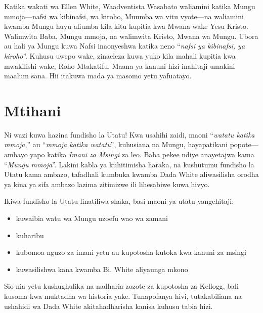 Katika wakati wa Ellen White, Waadventista Wasabato waliamini katika Mungu mmoja—nafsi wa kibinafsi, wa kiroho, Muumba wa vitu vyote—na waliamini kwamba Mungu huyu aliumba kila kitu kupitia kwa Mwana wake Yesu Kristo. Walimwita Baba, Mungu mmoja, na walimwita Kristo, Mwana wa Mungu. Ubora au hali ya Mungu kuwa Nafsi inaonyeshwa katika neno “\textit{nafsi ya kibinafsi, ya kiroho}”. Kuhusu uwepo wake,  zinaeleza kuwa yuko kila mahali kupitia kwa mwakilishi wake, Roho Mtakatifu. Maana ya kanuni hizi inahitaji umakini maalum sana. Hii itakuwa mada ya masomo yetu yafuatayo.

\section*{Mtihani}

Ni wazi kuwa  hazina fundisho la Utatu! Kwa usahihi zaidi, maoni “\textit{watatu katika mmoja},” au “\textit{mmoja katika watatu}”, kuhusiana na Mungu, hayapatikani popote—ambayo yapo katika \textit{Imani za Msingi} za leo. Baba pekee ndiye anayetajwa kama “\textit{Mungu mmoja}”. Lakini kabla ya kuhitimisha haraka, na kushutumu fundisho la Utatu kama ambazo, tafadhali kumbuka kwamba Dada White aliwasilisha orodha ya kina ya sifa ambazo lazima zitimizwe ili lihesabiwe kuwa hivyo.

Ikiwa fundisho la Utatu linatiliwa shaka, basi maoni ya utatu yangehitaji:
\begin{itemize}
    \item kuwaibia watu wa Mungu uzoefu wao wa zamani
    \item kuharibu 
    \item kubomoa nguzo za imani yetu au kupotosha kutoka kwa kanuni za msingi
    \item kuwasilishwa kana kwamba Bi. White aliyaunga mkono
\end{itemize}

Sio nia yetu kushughulika na nadharia zozote za kupotosha za Kellogg, bali kusoma  kwa muktadha wa historia yake. Tunapofanya hivi, tutakabiliana na ushahidi wa Dada White akitahadharisha kanisa kuhusu tabia hizi.


